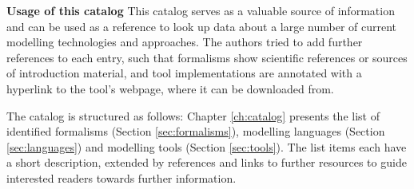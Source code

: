 \documentclass[final]{include/MPM4CPS/MPM4CPS-Report} %
\begin{document}
 







\textbf{Usage of this catalog} This catalog serves as a valuable source of information and can be used as a reference to look up data about a large number of current modelling technologies and approaches.
The authors tried to add further references to each entry, such that formalisms show scientific references or sources of introduction material, and tool implementations are annotated with a hyperlink to the tool's webpage, where it can be downloaded from.

The catalog is structured as follows:
Chapter \ref{ch:catalog} presents the list of identified formalisms (Section \ref{sec:formalisms}), modelling languages (Section \ref{sec:languages}) and modelling tools (Section \ref{sec:tools}).
The list items each have a short description, extended by references and links to further resources to guide interested readers towards further information.
\end{document}
